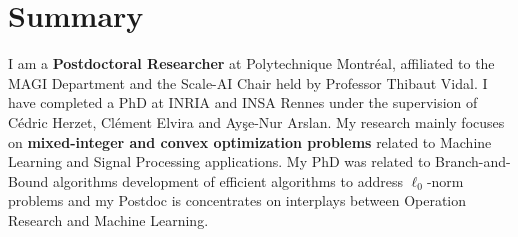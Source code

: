 \section{Summary}

I am a \textbf{Postdoctoral Researcher} at Polytechnique Montréal, affiliated to the MAGI Department and the Scale-AI Chair held by Professor Thibaut Vidal.
I have completed a PhD at INRIA and INSA Rennes under the supervision of Cédric Herzet, Clément Elvira and Ayşe-Nur Arslan.
My research mainly focuses on \textbf{mixed-integer and convex optimization problems} related to Machine Learning and Signal Processing applications.
My PhD was related to Branch-and-Bound algorithms development of efficient algorithms to address $\ell_0$-norm problems and my Postdoc is concentrates on interplays between Operation Research and Machine Learning.
